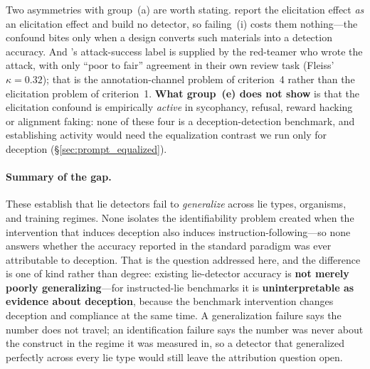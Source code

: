 Two asymmetries with group~(a) are worth stating. \citet{sharma2023sycophancy} report the elicitation effect \emph{as} an elicitation effect and build no detector, so failing~(i) costs them nothing---the confound bites only when a design converts such materials into a detection accuracy. And \citet{ganguli2022red}'s attack-success label is supplied by the red-teamer who wrote the attack, with only ``poor to fair'' agreement in their own review task (Fleiss' $\kappa\!=\!0.32$); that is the annotation-channel problem of criterion~4 rather than the elicitation problem of criterion~1. \textbf{What group~(e) does not show} is that the elicitation confound is empirically \emph{active} in sycophancy, refusal, reward hacking or alignment faking: none of these four is a deception-detection benchmark, and establishing activity would need the equalization contrast we run only for deception (§\ref{sec:prompt_equalized}).

\paragraph{Summary of the gap.} These establish that lie detectors fail to \emph{generalize} across lie types, organisms, and training regimes. None isolates the identifiability problem created when the intervention that induces deception also induces instruction-following---so none answers whether the accuracy reported in the standard paradigm was ever attributable to deception. That is the question addressed here, and the difference is one of kind rather than degree: existing lie-detector accuracy is \textbf{not merely poorly generalizing}---for instructed-lie benchmarks it is \textbf{uninterpretable as evidence about deception}, because the benchmark intervention changes deception and compliance at the same time. A generalization failure says the number does not travel; an identification failure says the number was never about the construct in the regime it was measured in, so a detector that generalized perfectly across every lie type would still leave the attribution question open.

